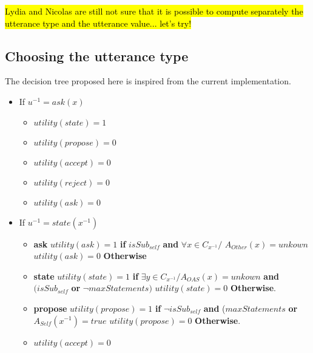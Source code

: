 \documentclass{llncs}
\begin{document}
\hl{Lydia and Nicolas are still not sure that it is possible to compute separately the utterance type and the utterance value... let's try!}


\subsection{Choosing the utterance type}
The decision tree proposed here is inspired from the current implementation. 

\begin{itemize}
	\item If $u ^{-1}=ask (x)$ 
	\begin{itemize}
		\item $utility(state) = 1$
		\item $utility(propose) = 0$
		\item $utility(accept) = 0$
		\item $utility(reject) = 0$		
		\item $utility(ask) = 0$
		\\
	\end{itemize}
	
	\item If $u ^{-1}=state(x^{-1})$
	\begin{itemize}
		\item\textbf{ask}
		\subitem $utility(ask) = 1$ \textbf{ if } $ isSub_{self}$ \textbf{ and } {$\forall x \in C_{x^{-1}} /$ $ A_{Other} (x) = unkown$ }
		\subitem $utility(ask) = 0$ \textbf{Otherwise}
		
		\item \textbf{state}
		\subitem $utility(state) = 1$ \textbf{ if } $ \exists y \in C_{x^{-1}} / A_{OAS} (x) = unkown$ \textbf{ and } $ (isSub_{self}$  \textbf{ or } $\neg maxStatements)$
		\subitem $utility(state) = 0$ \textbf{Otherwise}.
		
		\item \textbf{propose}
		\subitem $utility(propose) = 1$ \textbf{ if } $\neg isSub_{self}$ \textbf{ and } ($maxStatements$ \textbf{ or } $A_{Self} (x^{-1}) = true$
		\subitem $utility(propose) = 0$ \textbf{Otherwise}.
	
		\item $utility(accept) = 0$
		

\end{itemize}
\end{itemize}
\end{document}
